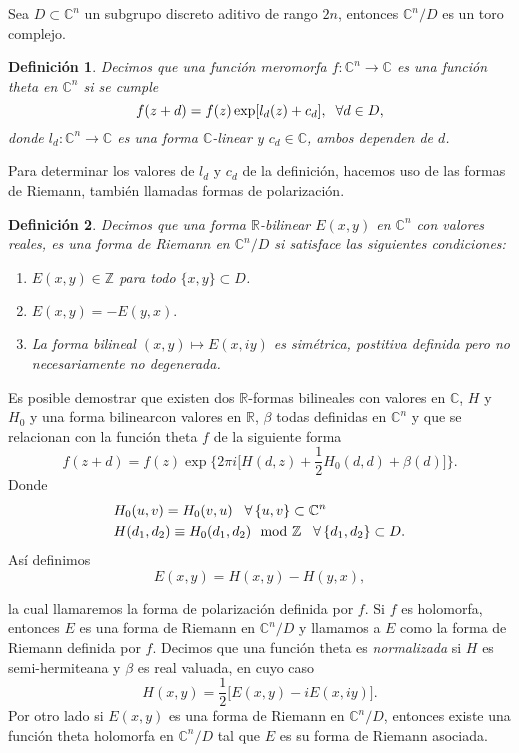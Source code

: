 \documentclass[letterpaper]{report}
\newtheorem{def.}{Definici\'on}[chapter]
\newcommand{\dbz}{\ensuremath{ \mathbb Z }}
\newcommand{\co}{\ensuremath{\mathbb C }}
\newcommand{\re}{\ensuremath{\mathbb R }}
\begin{document}
\noindent Sea $D\subset\co^n$ un subgrupo discreto aditivo de rango $2n$, entonces $\co^n/D$ es un toro complejo.
\begin{def.}
Decimos que una función meromorfa $f:\co^n\rightarrow\co$ es una \textit{función theta} en $\co^n$ si se cumple
\begin{equation}
	f(z+d)=f(z)\exp [l_d(z)+c_d] ,\hspace{0.2cm}\forall d\in D,
\end{equation} 
\noindent donde $l_d:\co^n\rightarrow\co$ es una forma $\co$-linear y $c_d\in\co$, ambos dependen de $d$.
\end{def.}
Para determinar los valores de $l_d$ y $c_d$ de la definición, hacemos uso de las formas de Riemann, también llamadas formas de polarización.
\begin{def.} 
Decimos que una forma $\re$-bilinear $E(x,y)$ en $\co^n$ con valores reales, es una \textit{forma de Riemann} en $\co^n/D$ si satisface las siguientes condiciones:
\begin{enumerate}
	\item[i)] $E(x,y)\in\dbz$ para todo $\lbrace x,y\rbrace\subset D$.
	\item[ii)]$E(x,y)=-E(y,x).$
	\item[iii)]La forma bilineal $(x,y)\mapsto E(x,iy)$ es simétrica, postitiva definida pero no necesariamente no degenerada.
\end{enumerate}
\end{def.}  
Es posible demostrar que existen dos $\re$-formas bilineales con valores en $\co$, $H$ y $H_0$ y una forma bilinearcon valores en $\re$, $\beta$ todas definidas en $\co^n$  y que se relacionan con la función theta $f$ de la siguiente forma
\begin{equation}
	f(z+d)=f(z)\exp \big\lbrace2\pi i \big[H(d,z)+\frac{1}{2}H_0(d,d)+\beta(d)\big]\big\rbrace.
\end{equation}
\noindent Donde
\begin{align}
	& H_0(u,v)  =  H_0(v,u) \hspace{0.3cm}  \forall \,\lbrace u,v\rbrace\subset\co^n \\
	& H(d_1,d_2)  \equiv H_0(d_1,d_2) \mod\dbz\hspace{0.3cm}\forall\,\lbrace d_1,d_2\rbrace\subset D.
\end{align}
Así definimos
$$E(x,y)=H(x,y)-H(y,x),$$

\noindent la cual llamaremos la forma de polarización definida por $f$. Si $f$ es holomorfa, entonces $E$ es una forma de Riemann en $\co^n/D$ y llamamos a $E$ como la forma de Riemann definida por $f$. Decimos que una función theta es \textit{normalizada} si $H$ es semi-hermiteana y $\beta$ es real valuada, en cuyo caso
\begin{equation}
	H(x,y)=\frac{1}{2}\big[E(x,y)-iE(x,iy)\big].
\end{equation}
Por otro lado si $E(x,y)$ es una forma de Riemann en $\co^n/D$, entonces existe una función theta holomorfa en $\co^n/D$ tal que $E$ es su forma de Riemann asociada.
\end{document}
